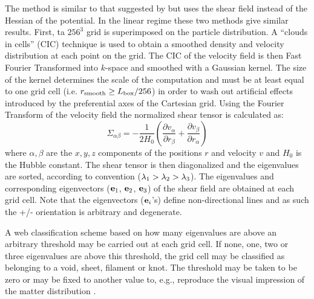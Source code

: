 The method is similar to that suggested by \citep{2007MNRAS.375..489H} but uses the shear field instead of the Hessian of the potential. In the linear regime these two methods give similar results. First, ta $256^{3}$ grid is superimposed on the particle distribution. A ``clouds in cells'' (CIC) technique is used to obtain a smoothed density and velocity distribution at each point on the grid. The CIC of the velocity field is then Fast Fourier Transformed into $k$-space and smoothed with a Gaussian kernel. The size of the kernel determines the scale of the computation and must be at least equal to one grid cell (i.e. $r_{\rm smooth}\ge L_{\rm box}/256$) in order to wash out artificial effects introduced by the preferential axes of the Cartesian grid. Using the Fourier Transform of the velocity field the normalized shear tensor is calculated as:
\begin{equation}
\Sigma_{\alpha\beta} = -\frac{1}{2H_{0}}\left(\frac{\partial v_{\alpha}}{\partial r_{\beta}}+\frac{\partial v_{\beta}}{\partial r_{\alpha}}\right)
\end{equation}
where $\alpha, \beta$ are the $x,y,z$ components of the positions $r$ and velocity $v$ and $H_{0}$ is the Hubble constant. The shear tensor is then diagonalized and the eigenvalues are sorted, according to convention ($\lambda_{\rm1}>\lambda_{\rm2}>\lambda_{\rm3}$). The eigenvalues  and corresponding eigenvectors (${\bf e}_{\rm 1}$, ${\bf e}_{\rm 2}$, ${\bf e}_{\rm 3}$) of the shear field are obtained at each grid cell. Note that the eigenvectors (${\bf e}_{i}$'s) define non-directional lines and as such the +/- orientation is arbitrary and degenerate.

A web classification scheme based on how many eigenvalues are above an arbitrary threshold may be carried out at each grid cell. If none, one, two or three eigenvalues are above this threshold, the grid cell may be classified as belonging to a void, sheet, filament or knot. The threshold may be taken to be zero \citep[as in][]{2007MNRAS.375..489H} or may be fixed to another value to, e.g., reproduce the visual impression of the matter distribution \citep{2009MNRAS.396.1815F}.



